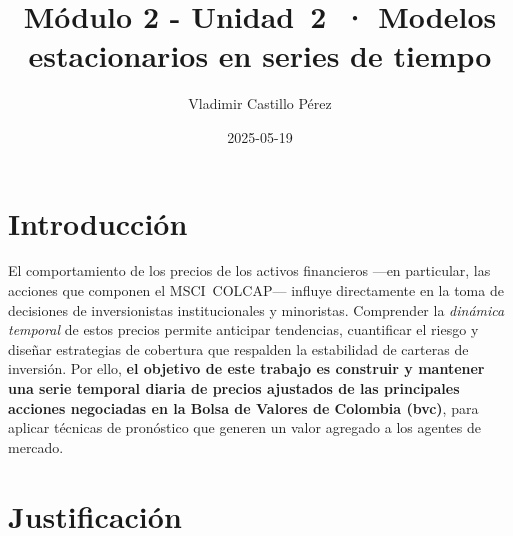 \documentclass[
  11pt,
]{book}
\title{Módulo 2 - Unidad~2~· Modelos estacionarios en series de tiempo}
\author{Vladimir Castillo Pérez}
\date{2025-05-19}
\begin{document}
\maketitle

{
\setcounter{tocdepth}{1}
\tableofcontents
}
\chapter{Introducción}\label{introducciuxf3n}

El comportamiento de los precios de los activos financieros ---en particular, las acciones que componen el MSCI~COLCAP--- influye directamente en la toma de decisiones de inversionistas institucionales y minoristas. Comprender la \emph{dinámica temporal} de estos precios permite anticipar tendencias, cuantificar el riesgo y diseñar estrategias de cobertura que respalden la estabilidad de carteras de inversión. Por ello, \textbf{el objetivo de este trabajo es construir y mantener una serie temporal diaria de precios ajustados de las principales acciones negociadas en la Bolsa de Valores de Colombia (bvc)}, para aplicar técnicas de pronóstico que generen un valor agregado a los agentes de mercado.

\chapter{Justificación}\label{justificaciuxf3n}
\end{document}

